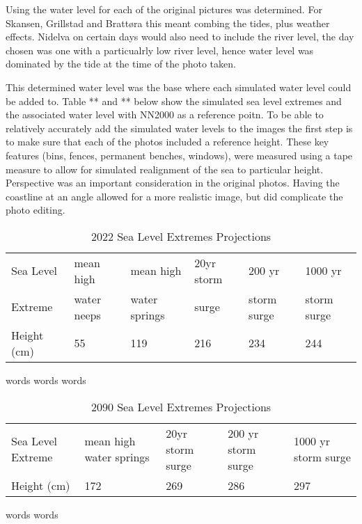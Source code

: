 Using \cite{tides_high_2022}the water level for each of the original pictures was determined. For Skansen, Grillstad and Brattøra this meant combing the tides, plus weather effects. Nidelva on certain days would also need to include the river level, the day chosen was one with a particualrly low river level, hence water level was dominated by the tide at the time of the photo taken.   

This determined water level was the base where each simulated water level could be added to. Table ** and ** below show the simulated sea level extremes and the associated water level with NN2000 as a reference poitn.  To be able to relatively accurately add the simulated water levels to the images the first step is to make sure that each of the photos included a reference height. These key features (bins, fences, permanent benches, windows), were measured using a tape measure to allow for simulated realignment of the sea to particular height. Perspective was an important consideration in the original photos. Having the coastline at an angle allowed for a more realistic image, but did complicate the photo editing. 

\begin{table}[h]
    \centering
    \begin{tabular}{|l|l|l|l|l|l|}
    \hline
     Sea Level &   mean high  & mean high  & 20yr storm  & 200 yr   & 1000 yr  \\ \newline
     Extreme &  water neeps & water springs &  surge  & storm surge  &  storm surge  \\ \hline
       Height (cm) &  55 & 119 & 216 & 234 & 244 \\ \hline
    \end{tabular}
    \caption{2022 Sea Level Extremes Projections}
    \label{2022_sle_projections}
\end{table}

words words words
\begin{table}[h]
    \centering
    \begin{tabular}{|l|l|l|l|l|}
    \hline
        \\ \hline
       Sea Level Extreme &  mean high water springs & 20yr storm surge  & 200 yr storm surge  &  1000 yr storm surge  \\ \hline
       Height (cm) & 172 & 269 & 286 & 297 \\ \hline
    \end{tabular}
    \caption{2090 Sea Level Extremes Projections}
    \label{2090_sle_projections}
\end{table}
words words
